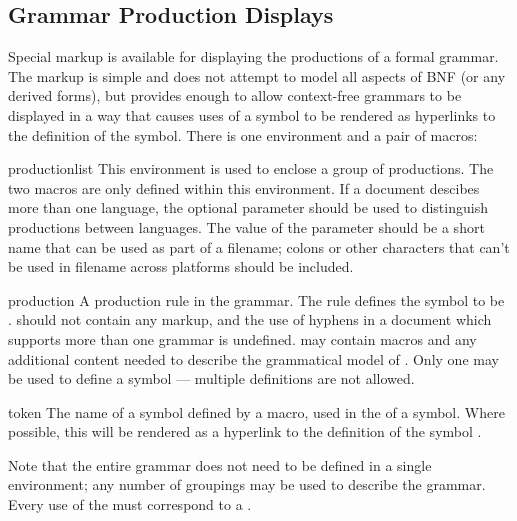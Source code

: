 \documentclass{howto}
\begin{document}
  \subsection{Grammar Production Displays \label{grammar-displays}}

    Special markup is available for displaying the productions of a
    formal grammar.  The markup is simple and does not attempt to
    model all aspects of BNF (or any derived forms), but provides
    enough to allow context-free grammars to be displayed in a way
    that causes uses of a symbol to be rendered as hyperlinks to the
    definition of the symbol.  There is one environment and a pair of
    macros:

    \begin{envdesc}{productionlist}{}
      This environment is used to enclose a group of productions.  The
      two macros are only defined within this environment.  If a
      document descibes more than one language, the optional parameter
       should be used to distinguish productions between
      languages.  The value of the parameter should be a short name
      that can be used as part of a filename; colons or other
      characters that can't be used in filename across platforms
      should be included.
    \end{envdesc}

    \begin{macrodesc}{production}{}
      A production rule in the grammar.  The rule defines the symbol
       to be .   should not
      contain any markup, and the use of hyphens in a document which
      supports more than one grammar is undefined.  
      may contain  macros and any additional content
      needed to describe the grammatical model of .  Only
      one  may be used to define a symbol ---
      multiple definitions are not allowed.
    \end{macrodesc}

    \begin{macrodesc}{token}{}
      The name of a symbol defined by a  macro, used
      in the  of a symbol.  Where possible, this will
      be rendered as a hyperlink to the definition of the symbol
      .
    \end{macrodesc}

    Note that the entire grammar does not need to be defined in a
    single  environment; any number of
    groupings may be used to describe the grammar.  Every use of the
     must correspond to a .
\end{document}
